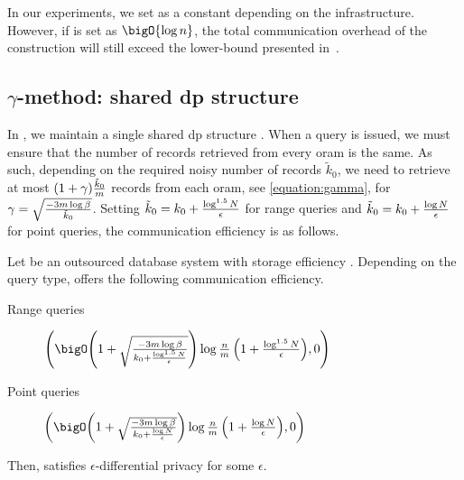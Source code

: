 		In our experiments, we set \oramsNumber{} as a constant depending on the infrastructure.
		However, if \oramsNumber{} is set as $\bigO{\log n}$, the total communication overhead of the construction will still exceed the lower-bound presented in~\cite{multi-server-orams}.

	\subsection{\texorpdfstring{$\gamma$-method}{Gamma-method}: shared \acrshort{dp} structure}\label{section:prallel-dp-oram:gamma}

		In \protocolGamma{}, we maintain a single shared \acrshort{dp} structure \serverDS{}.
		When a query is issued, we must ensure that the number of records retrieved from every \acrshort{oram} is the same.
		As such, depending on the required noisy number of records $\tilde{k}_0$, we need to retrieve at most $( 1 + \gamma ) \frac{ \tilde{k}_0 }{m}$ records from each \acrshort{oram}, see \cref{equation:gamma}, for $\gamma = \sqrt{ \frac{-3 m \log \beta}{ \tilde{k}_0 } }$.
		Setting $\tilde{k}_0 = k_0 + \frac{\log^{1.5} N}{\epsilon}$ for range queries and $\tilde{k}_0 = k_0 + \frac{\log N}{\epsilon}$ for point queries, the communication efficiency is as follows.

		\begin{corollary}\label{corollary:gamma}
			Let \protocolGamma{} be an outsourced database system with storage efficiency .
			Depending on the query type, \protocolGamma{} offers the following communication efficiency.
			\begin{description}
				\item[Range queries] $\efficiency{ \left( 1 + \sqrt{ \frac{-3 \oramsNumber \log \beta}{k_0 + \frac{ \log^{1.5} \domainSize }{ \epsilon }} }\right) \log \frac{\dataSize}{\oramsNumber} \left( 1 + \frac{\log^{1.5} \domainSize}{\epsilon} \right) }{0}$
				\item[Point queries] $\efficiency{ \left( 1 + \sqrt{ \frac{-3 \oramsNumber \log \beta}{k_0 + \frac{ \log \domainSize }{ \epsilon }} }\right) \log \frac{\dataSize}{\oramsNumber} \left( 1 + \frac{\log \domainSize}{\epsilon} \right) }{0}$
			\end{description}
			Then, \protocolGamma{} satisfies $\epsilon$-differential privacy for some $\epsilon$.
		\end{corollary}

